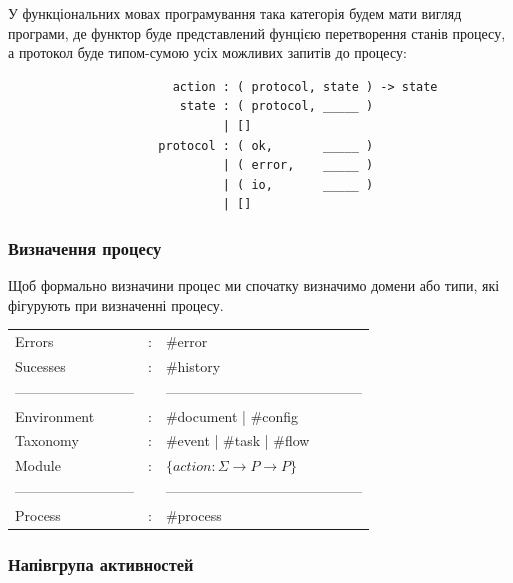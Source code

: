 \documentclass[11pt,oneside]{article}
\begin{document}
   У функціональних мовах програмування така категорія будем мати вигляд програми,
   де функтор буде представлений фунцією перетворення станів процесу, а протокол
   буде типом-сумою усіх можливих запитів до процесу:

\begin{center}
\begin{lstlisting}
                       action : ( protocol, state ) -> state
                        state : ( protocol, _____ )
                              | []
                     protocol : ( ok,       _____ )
                              | ( error,    _____ )
                              | ( io,       _____ )
                              | []
\end{lstlisting}
\end{center}

   \subsubsection*{Визначення процесу}

   Щоб формально визначини процес ми спочатку визначимо домени або типи,
   які фігурують при визначенні процесу.



\begin{center}
\begin{tabular}{lcl}
                Errors &:& \#error\\
              Sucesses &:& \#history\\
        --------------------------&&------------------------------------------\\
           Environment &:& \#document | \#config\\
              Taxonomy &:& \#event    | \#task   | \#flow\\
                Module &:& $\{ action : \Sigma \rightarrow P \rightarrow P \}$\\
        --------------------------&&------------------------------------------\\
               Process &:& \#process\\
\end{tabular}
\end{center}

\newpage
  \subsubsection*{Напівгрупа активностей}
\end{document}
